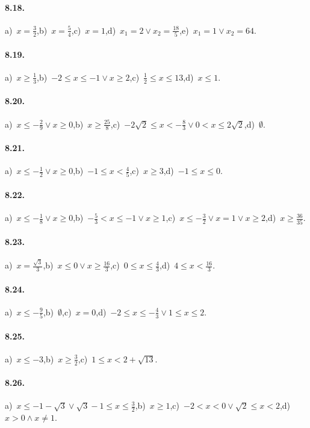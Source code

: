 \paragraph{8.18.} a)~$x=\frac 3 2$,\quad b)~$x=\frac 5 4$,\quad c)~$x=1$,\quad d)~$x_1=2\vee x_2=\frac{18} 5$,\quad e)~$x_1=1\vee x_2=64$.

\paragraph{8.19.} a)~$x\ge \frac 1 3$,\quad b)~$-2\le x\le -1\vee x\ge 2$,\quad c)~$\frac 1 2\le x\le 13$,\quad d)~$x\le 1$.

\paragraph{8.20.} a)~$x\le -\frac 2 9\vee x\ge 0$,\quad b)~$x\ge \frac{25} 8$,\quad c)~$-2\sqrt 2\le x<-\frac 8 3\vee 0<x\le 2\sqrt 2$,\quad d)~$ \emptyset $.

\paragraph{8.21.} a)~$x\le -\frac 1 2\vee x\ge 0$,\quad b)~$-1\le x<\frac 4 5$,\quad c)~$x\ge 3$,\quad d)~$-1\le x\le 0$.

\paragraph{8.22.} a)~$x\le -\frac 1 8\vee x\ge 0$,\quad b)~$-\frac 5 3<x\le -1\vee x\ge 1$,\quad c)~$x\le -\frac 3 2\vee x=1\vee x\ge 2$,\quad d)~$x\ge \frac{36}{35}$.

\paragraph{8.23.} a)~$x=\frac{\sqrt 3} 3$,\quad b)~$x\le 0\vee x\ge \frac{16} 3$,\quad c)~$0\le x\le \frac 4 3$,\quad d)~$4\le x<\frac{16} 3$.

\paragraph{8.24.} a)~$x\le -\frac 9 5$,\quad b)~$ \emptyset $,\quad c)~$x=0$,\quad d)~$-2\le x\le -\frac 4 3\vee 1\le x\le 2$.

\paragraph{8.25.} a)~$x\le -3$,\quad b)~$x\ge \frac 3 2$,\quad c)~$1\le x<2+\sqrt{13}$.

\paragraph{8.26.} a)~$x\le-1-\sqrt{3}\vee \sqrt{3}-1\le x\le \frac{3}{2}$,\quad b)~$x\ge 1$,\quad c)~$-2<x<0\vee \sqrt{2}\le x<2$,\quad d)~$x>0 \wedge x\neq 1$.

